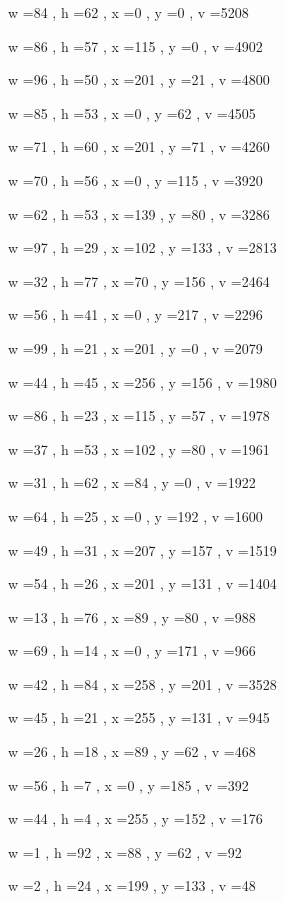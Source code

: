 \documentclass[11pt]{article}
\begin{document}
w =84 , h =62 , x =0 , y =0 , v =5208
\par
w =86 , h =57 , x =115 , y =0 , v =4902
\par
w =96 , h =50 , x =201 , y =21 , v =4800
\par
w =85 , h =53 , x =0 , y =62 , v =4505
\par
w =71 , h =60 , x =201 , y =71 , v =4260
\par
w =70 , h =56 , x =0 , y =115 , v =3920
\par
w =62 , h =53 , x =139 , y =80 , v =3286
\par
w =97 , h =29 , x =102 , y =133 , v =2813
\par
w =32 , h =77 , x =70 , y =156 , v =2464
\par
w =56 , h =41 , x =0 , y =217 , v =2296
\par
w =99 , h =21 , x =201 , y =0 , v =2079
\par
w =44 , h =45 , x =256 , y =156 , v =1980
\par
w =86 , h =23 , x =115 , y =57 , v =1978
\par
w =37 , h =53 , x =102 , y =80 , v =1961
\par
w =31 , h =62 , x =84 , y =0 , v =1922
\par
w =64 , h =25 , x =0 , y =192 , v =1600
\par
w =49 , h =31 , x =207 , y =157 , v =1519
\par
w =54 , h =26 , x =201 , y =131 , v =1404
\par
w =13 , h =76 , x =89 , y =80 , v =988
\par
w =69 , h =14 , x =0 , y =171 , v =966
\par
w =42 , h =84 , x =258 , y =201 , v =3528
\par
w =45 , h =21 , x =255 , y =131 , v =945
\par
w =26 , h =18 , x =89 , y =62 , v =468
\par
w =56 , h =7 , x =0 , y =185 , v =392
\par
w =44 , h =4 , x =255 , y =152 , v =176
\par
w =1 , h =92 , x =88 , y =62 , v =92
\par
w =2 , h =24 , x =199 , y =133 , v =48
\par
\newpage
\end{document}

